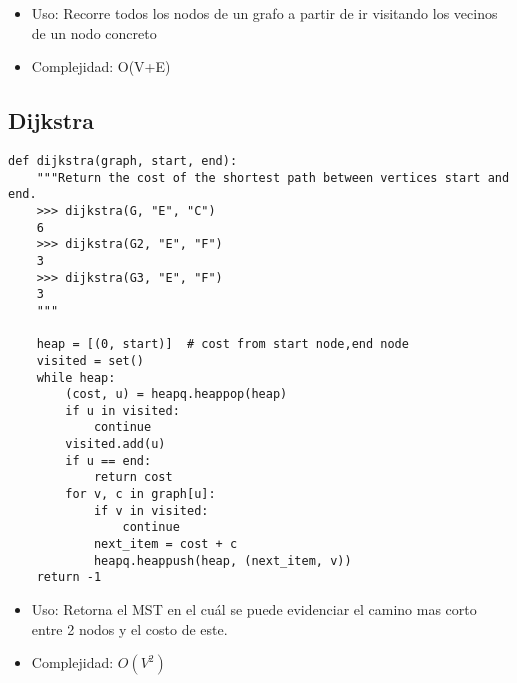 \documentclass[a4paper]{article}
\begin{document}
\begin{itemize}
    \item Uso: Recorre todos los nodos de un grafo a partir de ir visitando los
    vecinos de un nodo concreto
    \item Complejidad: O(V+E)
    
\end{itemize}


\subsection{Dijkstra}
\begin{verbatim}
def dijkstra(graph, start, end):
    """Return the cost of the shortest path between vertices start and end.
    >>> dijkstra(G, "E", "C")
    6
    >>> dijkstra(G2, "E", "F")
    3
    >>> dijkstra(G3, "E", "F")
    3
    """

    heap = [(0, start)]  # cost from start node,end node
    visited = set()
    while heap:
        (cost, u) = heapq.heappop(heap)
        if u in visited:
            continue
        visited.add(u)
        if u == end:
            return cost
        for v, c in graph[u]:
            if v in visited:
                continue
            next_item = cost + c
            heapq.heappush(heap, (next_item, v))
    return -1
\end{verbatim}

\begin{itemize}
    \item Uso: Retorna el MST en el cuál se puede evidenciar el camino mas corto entre 2
    nodos y el costo de este.
    \item Complejidad: $O(V^2)$
    
\end{itemize}
\end{document}
